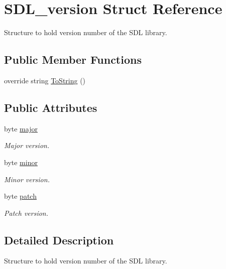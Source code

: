 \hypertarget{struct_s_d_l__version}{
\section{SDL\_\-version Struct Reference}
\label{struct_s_d_l__version}
}


Structure to hold version number of the SDL library.  


\subsection*{Public Member Functions}
\begin{DoxyCompactItemize}
\item 
override string \hyperlink{struct_s_d_l__version_a5afeedfb93de41d421f994ea83377271}{ToString} ()
\end{DoxyCompactItemize}
\subsection*{Public Attributes}
\begin{DoxyCompactItemize}
\item 
byte \hyperlink{struct_s_d_l__version_a30dd21c1e73d149d73cee6c63f26305c}{major}
\begin{DoxyCompactList}\small\item\em Major version. \item\end{DoxyCompactList}\item 
byte \hyperlink{struct_s_d_l__version_aa68b2cb76d4100d56da5e29023e9d617}{minor}
\begin{DoxyCompactList}\small\item\em Minor version. \item\end{DoxyCompactList}\item 
byte \hyperlink{struct_s_d_l__version_a1f284689bed1b04fc3e52f053109860f}{patch}
\begin{DoxyCompactList}\small\item\em Patch version. \item\end{DoxyCompactList}\end{DoxyCompactItemize}


\subsection{Detailed Description}
Structure to hold version number of the SDL library. 

